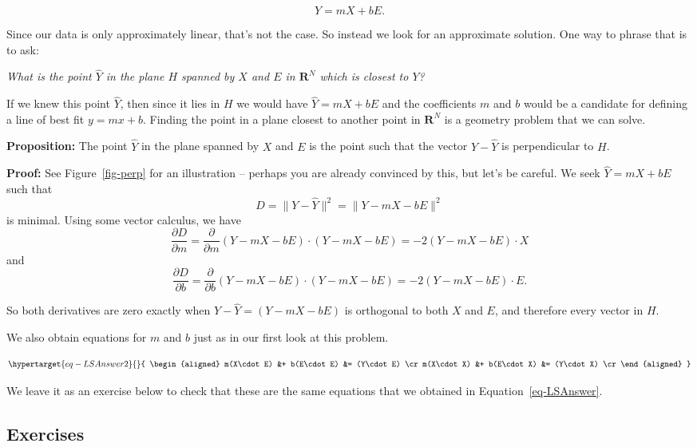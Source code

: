 \documentclass[
  11pt,
  letterpaper,
]{scrbook}
\theoremstyle{plain}
\theoremstyle{remark}
\begin{document}
\[ Y = mX + bE. \]

Since our data is only approximately linear, that's not the case. So
instead we look for an approximate solution. One way to phrase that is
to ask:

\emph{What is the point \(\hat{Y}\) in the plane \(H\) spanned by \(X\)
and \(E\) in \(\mathbf{R}^{N}\) which is closest to \(Y\)?}

If we knew this point \(\hat{Y}\), then since it lies in \(H\) we would
have \(\hat{Y}=mX+bE\) and the coefficients \(m\) and \(b\) would be a
candidate for defining a line of best fit \(y=mx+b\). Finding the point
in a plane closest to another point in \(\mathbf{R}^{N}\) is a geometry
problem that we can solve.

\textbf{Proposition:} The point \(\hat{Y}\) in the plane spanned by
\(X\) and \(E\) is the point such that the vector \(Y-\hat{Y}\) is
perpendicular to \(H\).

\textbf{Proof:} See Figure~\ref{fig-perp} for an illustration -- perhaps
you are already convinced by this, but let's be careful. We seek
\(\hat{Y}=mX+bE\) such that \[ D = \|Y-\hat{Y}\|^2 = \|Y-mX-bE\|^2 \] is
minimal. Using some vector calculus, we have
\[ \frac{\partial D}{\partial m} =
\frac{\partial}{\partial m} (Y-mX-bE)\cdot (Y-mX-bE) =
-2(Y-mX-bE)\cdot X \] and \[ \frac{\partial D}{\partial b} =
\frac{\partial}{\partial b} (Y-mX-bE)\cdot (Y-mX-bE) =
-2(Y-mX-bE)\cdot E. \]

So both derivatives are zero exactly when \(Y-\hat{Y}=(Y-mX-bE)\) is
orthogonal to both \(X\) and \(E\), and therefore every vector in \(H\).

We also obtain equations for \(m\) and \(b\) just as in our first look
at this problem.

\begin{equation}\protect\hypertarget{eq-LSAnswer2}{}{
\begin{aligned} m(X\cdot E) &+ b(E\cdot E) &= (Y\cdot E) \cr
m(X\cdot X) &+ b(E\cdot X) &= (Y\cdot X) \cr \end{aligned}
}\label{eq-LSAnswer2}\end{equation}

We leave it as an exercise below to check that these are the same
equations that we obtained in Equation~\ref{eq-LSAnswer}.

\hypertarget{exercises}{%
\subsection{Exercises}\label{exercises}}
\end{document}
